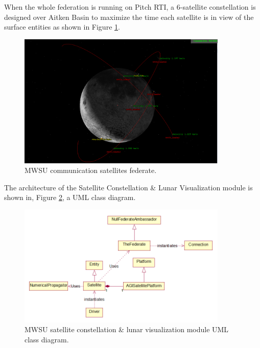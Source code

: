 \documentclass[journal, onecolumn]{IEEEtran}
\begin{document}
When the whole federation is running on Pitch RTI, a 6-satellite constellation is designed over Aitken Basin to maximize the time each satellite is in view of the surface entities as shown in Figure \ref{Satellites}.
\begin{figure}[!htbp]
	\centering
		\includegraphics[width=100mm]{Satellites.PNG}
		\caption{MWSU communication satellites federate.}
	\label{Satellites}
\end{figure}

The architecture of the Satellite Constellation \& Lunar Visualization module is shown in, Figure \ref {Class}, a UML class diagram.

\begin{figure}[!htbp]
	\centering
		\includegraphics[width=100mm]{ClassDiagram.png}
		\caption{MWSU satellite constellation \& lunar visualization module UML class diagram.}
	\label{Class}
\end{figure}
\end{document}
